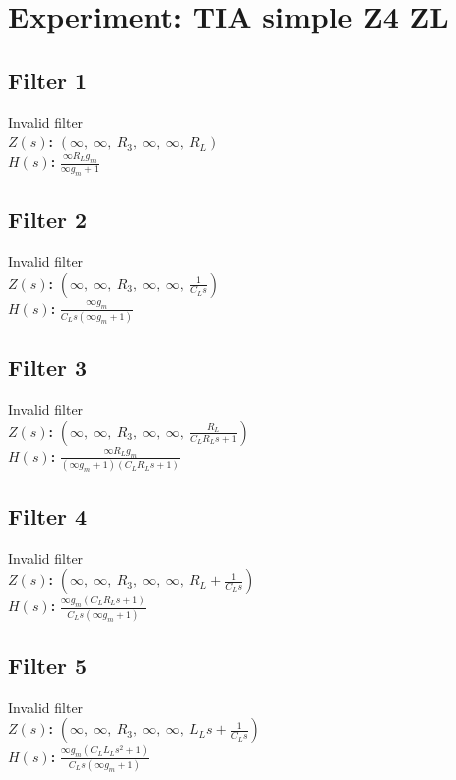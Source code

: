 \documentclass{article}
\begin{document}
        \section*{Experiment: TIA simple Z4 ZL}
\subsection*{Filter 1}
Invalid filter \\ 
\textbf{$Z(s)$:} $\left( \infty, \  \infty, \  R_{3}, \  \infty, \  \infty, \  R_{L}\right)$ \\ 
\textbf{$H(s)$:} $\frac{\infty R_{L} g_{m}}{\infty g_{m} + 1}$ \\ 
\subsection*{Filter 2}
Invalid filter \\ 
\textbf{$Z(s)$:} $\left( \infty, \  \infty, \  R_{3}, \  \infty, \  \infty, \  \frac{1}{C_{L} s}\right)$ \\ 
\textbf{$H(s)$:} $\frac{\infty g_{m}}{C_{L} s \left(\infty g_{m} + 1\right)}$ \\ 
\subsection*{Filter 3}
Invalid filter \\ 
\textbf{$Z(s)$:} $\left( \infty, \  \infty, \  R_{3}, \  \infty, \  \infty, \  \frac{R_{L}}{C_{L} R_{L} s + 1}\right)$ \\ 
\textbf{$H(s)$:} $\frac{\infty R_{L} g_{m}}{\left(\infty g_{m} + 1\right) \left(C_{L} R_{L} s + 1\right)}$ \\ 
\subsection*{Filter 4}
Invalid filter \\ 
\textbf{$Z(s)$:} $\left( \infty, \  \infty, \  R_{3}, \  \infty, \  \infty, \  R_{L} + \frac{1}{C_{L} s}\right)$ \\ 
\textbf{$H(s)$:} $\frac{\infty g_{m} \left(C_{L} R_{L} s + 1\right)}{C_{L} s \left(\infty g_{m} + 1\right)}$ \\ 
\subsection*{Filter 5}
Invalid filter \\ 
\textbf{$Z(s)$:} $\left( \infty, \  \infty, \  R_{3}, \  \infty, \  \infty, \  L_{L} s + \frac{1}{C_{L} s}\right)$ \\ 
\textbf{$H(s)$:} $\frac{\infty g_{m} \left(C_{L} L_{L} s^{2} + 1\right)}{C_{L} s \left(\infty g_{m} + 1\right)}$ \\ 
\end{document}
